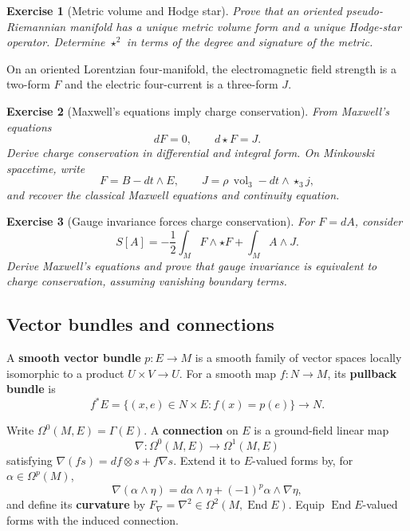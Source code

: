 \documentclass{article}
\newtheorem{exercise}{Exercise}
\newcommand{\End}{\operatorname{End}}
\begin{document}
\begin{exercise}[Metric volume and Hodge star]\leavevmode\par
\textit{Prove that an oriented pseudo-Riemannian manifold has a unique metric volume form and a unique Hodge-star operator. Determine $\star^2$ in terms of the degree and signature of the metric.}
\end{exercise}

On an oriented Lorentzian four-manifold, the electromagnetic field strength is
a two-form $F$ and the electric four-current is a three-form $J$.

\begin{exercise}[Maxwell's equations imply charge conservation]\leavevmode\par
\textit{From Maxwell's equations}
\[
dF=0,
\qquad
d\star F=J.
\]
\textit{Derive charge conservation in differential and integral form. On
Minkowski spacetime, write}
\[
F=B-dt\wedge E,
\qquad
J=\rho\,\operatorname{vol}_3-dt\wedge\star_3j,
\]
\textit{and recover the classical Maxwell equations and continuity equation.}
\end{exercise}

\begin{exercise}[Gauge invariance forces charge conservation]\leavevmode\par
\textit{For $F=dA$, consider}
\[
S[A]
=-\frac12\int_M F\wedge\star F+\int_M A\wedge J.
\]
\textit{Derive Maxwell's equations and prove that gauge invariance is
equivalent to charge conservation, assuming vanishing boundary terms.}
\end{exercise}

\subsection{Vector bundles and connections}

A \textbf{smooth vector bundle} $p:E\to M$ is a smooth family of vector spaces locally isomorphic to a product $U\times V\to U$. For a smooth map $f:N\to M$, its \textbf{pullback bundle} is
\[
f^*E=\{(x,e)\in N\times E:f(x)=p(e)\}\longrightarrow N.
\]

Write $\Omega^0(M,E)=\Gamma(E)$. A \textbf{connection} on $E$ is a
ground-field linear map
\[
\nabla:\Omega^0(M,E)\longrightarrow\Omega^1(M,E)
\]
satisfying $\nabla(fs)=df\otimes s+f\nabla s$. Extend it to $E$-valued forms
by, for $\alpha\in\Omega^p(M)$,
\[
\nabla(\alpha\wedge\eta)
=d\alpha\wedge\eta+(-1)^p\alpha\wedge\nabla\eta,
\]
and define its \textbf{curvature} by
$F_\nabla=\nabla^2\in\Omega^2(M,\End E)$. Equip $\End E$-valued forms
with the induced connection.
\end{document}

